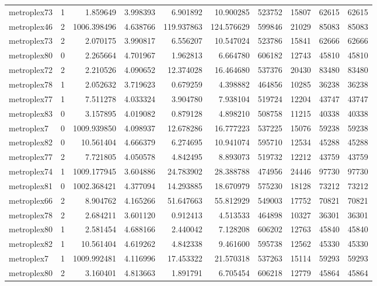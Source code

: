 \begin{longtable}{|l|r|r|r|r|r|r|r|r|r|}
metroplex73 & 1 & 1.859649 & 3.998393 & 6.901892 & 10.900285 & 523752 & 15807 & 62615 & 62615 \\
metroplex46 & 2 & 1006.398496 & 4.638766 & 119.937863 & 124.576629 & 599846 & 21029 & 85083 & 85083 \\
metroplex73 & 2 & 2.070175 & 3.990817 & 6.556207 & 10.547024 & 523786 & 15841 & 62666 & 62666 \\
metroplex80 & 0 & 2.265664 & 4.701967 & 1.962813 & 6.664780 & 606182 & 12743 & 45810 & 45810 \\
metroplex72 & 2 & 2.210526 & 4.090652 & 12.374028 & 16.464680 & 537376 & 20430 & 83480 & 83480 \\
metroplex78 & 1 & 2.052632 & 3.719623 & 0.679259 & 4.398882 & 464856 & 10285 & 36238 & 36238 \\
metroplex77 & 1 & 7.511278 & 4.033324 & 3.904780 & 7.938104 & 519724 & 12204 & 43747 & 43747 \\
metroplex83 & 0 & 3.157895 & 4.019082 & 0.879128 & 4.898210 & 508758 & 11215 & 40338 & 40338 \\
metroplex7 & 0 & 1009.939850 & 4.098937 & 12.678286 & 16.777223 & 537225 & 15076 & 59238 & 59238 \\
metroplex82 & 0 & 10.561404 & 4.666379 & 6.274695 & 10.941074 & 595710 & 12534 & 45288 & 45288 \\
metroplex77 & 2 & 7.721805 & 4.050578 & 4.842495 & 8.893073 & 519732 & 12212 & 43759 & 43759 \\
metroplex74 & 1 & 1009.177945 & 3.604886 & 24.783902 & 28.388788 & 474956 & 24446 & 97730 & 97730 \\
metroplex81 & 0 & 1002.368421 & 4.377094 & 14.293885 & 18.670979 & 575230 & 18128 & 73212 & 73212 \\
metroplex66 & 2 & 8.904762 & 4.165266 & 51.647663 & 55.812929 & 549003 & 17752 & 70821 & 70821 \\
metroplex78 & 2 & 2.684211 & 3.601120 & 0.912413 & 4.513533 & 464898 & 10327 & 36301 & 36301 \\
metroplex80 & 1 & 2.581454 & 4.688166 & 2.440042 & 7.128208 & 606202 & 12763 & 45840 & 45840 \\
metroplex82 & 1 & 10.561404 & 4.619262 & 4.842338 & 9.461600 & 595738 & 12562 & 45330 & 45330 \\
metroplex7 & 1 & 1009.992481 & 4.116996 & 17.453322 & 21.570318 & 537263 & 15114 & 59293 & 59293 \\
metroplex80 & 2 & 3.160401 & 4.813663 & 1.891791 & 6.705454 & 606218 & 12779 & 45864 & 45864 \\

\end{longtable}
